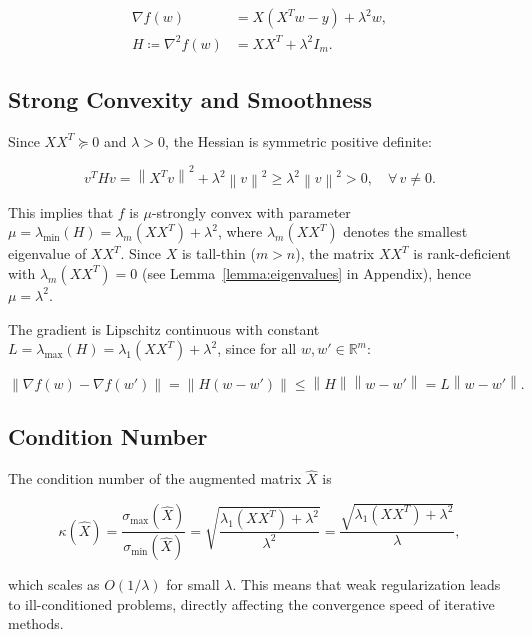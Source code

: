 \documentclass[11pt,a4paper]{article}
\newcommand{\R}{\mathbb{R}}
\newcommand{\norm}[1]{\left\|#1\right\|}
\newcommand{\Xhat}{\hat{X}}
\begin{document}
\begin{align}
    \nabla f(w) &= X(X^T w - y) + \lambda^2 w, \label{eq:gradient} \\
    H \coloneqq \nabla^2 f(w) &= XX^T + \lambda^2 I_m. \label{eq:hessian}
\end{align}

\subsection{Strong Convexity and Smoothness}

Since $XX^T \succeq 0$ and $\lambda > 0$, the Hessian is symmetric positive definite:

\begin{equation}
    v^T H v = \norm{X^T v}^2 + \lambda^2\norm{v}^2 \geq \lambda^2\norm{v}^2 > 0,
    \quad \forall\, v \neq 0.
\end{equation}

This implies that $f$ is $\mu$-strongly convex with parameter $\mu = \lambda_{\min}(H) = \lambda_m(XX^T) + \lambda^2$, 
where $\lambda_m(XX^T)$ denotes the smallest eigenvalue of $XX^T$. Since $X$ is tall-thin 
($m > n$), the matrix $XX^T$ is rank-deficient with $\lambda_m(XX^T) = 0$ 
(see Lemma~\ref{lemma:eigenvalues} in Appendix), hence $\mu = \lambda^2$.

The gradient is Lipschitz continuous with constant $L = \lambda_{\max}(H) = \lambda_1(XX^T) + \lambda^2$, 
since for all $w, w' \in \R^m$:

\begin{equation}
    \norm{\nabla f(w) - \nabla f(w')} = \norm{H(w - w')} \leq \norm{H}\norm{w - w'} = L\norm{w - w'}.
\end{equation}

\subsection{Condition Number}
\label{sec:conditioning}

The condition number of the augmented matrix $\Xhat$ is

\begin{equation}
\label{eq:condition}
    \kappa(\Xhat) = \frac{\sigma_{\max}(\Xhat)}{\sigma_{\min}(\Xhat)} 
    = \sqrt{\frac{\lambda_1(XX^T) + \lambda^2}{\lambda^2}} 
    = \frac{\sqrt{\lambda_1(XX^T) + \lambda^2}}{\lambda},
\end{equation}

which scales as $O(1/\lambda)$ for small $\lambda$. This means that weak regularization 
leads to ill-conditioned problems, directly affecting the convergence speed of iterative methods.
\end{document}
